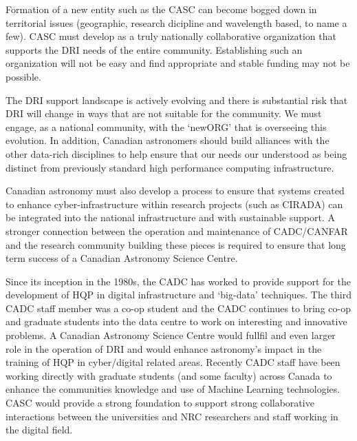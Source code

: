 \documentclass[11pt]{article}
\begin{document}
\begin{lrptextbox} 
Formation of a new entity such as the CASC can become bogged down in territorial issues (geographic, research dicipline and wavelength based, to name a few).  CASC must develop as a truly nationally collaborative organization that supports the DRI needs of the entire community.  Establishing such an organization will not be easy and find appropriate and stable funding may not be possible.

The DRI support landscape is actively evolving and there is substantial risk that DRI will change in ways that are not suitable for the community.  We must engage, as a national community, with the `newORG' that is overseeing this evolution.  In addition, Canadian astronomers should build alliances with the other data-rich disciplines to help ensure that our needs our understood as being distinct from previously standard high performance computing infrastructure.  

Canadian astronomy must also develop a process to ensure that systems created to enhance cyber-infrastructure within research projects (such as CIRADA) can be integrated into the national infrastructure and with sustainable support.  A stronger connection between the operation and maintenance of CADC/CANFAR and the research community building these pieces is required to ensure that long term success of a Canadian Astronomy Science Centre.

\end{lrptextbox}

\begin{lrptextbox} 
Since its inception in the 1980s, the CADC has worked to provide support for the development of HQP in digital infrastructure and `big-data' techniques. The third CADC staff member was a co-op student and the CADC continues to bring co-op and graduate students into the data centre to work on interesting and innovative problems.  A Canadian Astronomy Science Centre would fullfil and even larger role in the operation of DRI and would enhance astronomy's impact in the training of HQP in cyber/digital related areas.  Recently CADC staff have been working directly with graduate students (and some faculty) across Canada to enhance the communities knowledge and use of Machine Learning technologies.  CASC would provide a strong foundation to support strong collaborative interactions between the universities and NRC researchers and staff working in the digital field.
\end{lrptextbox}

 
\end{document}
